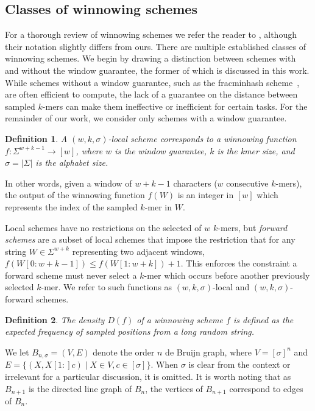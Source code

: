 \documentclass{article}
\newtheorem{definition}{Definition}[section]
\newcommand{\kmer}{{$k$-mer}}
\newcommand{\kmers}{{$k$-mers}}
\begin{document}
\subsection{Classes of winnowing schemes}
For a thorough review of winnowing schemes we refer the reader to \cite{shaw2022theory}, although their notation slightly differs from ours. There are multiple established classes of winnowing schemes. We begin by drawing a distinction between schemes with and without the window guarantee, the former of which is discussed in this work. While schemes without a window guarantee, such as the fracminhash scheme~\cite{irber2022lightweight}, are often efficient to compute, the lack of a guarantee on the distance between sampled \kmers{} can make them ineffective or inefficient for certain tasks. For the remainder of our work, we consider only schemes with a window guarantee. 

\begin{definition}
A $(w, k, \sigma)$-local scheme corresponds to a winnowing function $f: \Sigma^{w+k-1}\rightarrow [w]$, where $w$ is the window guarantee, $k$ is the kmer size, and $\sigma=|\Sigma|$ is the alphabet size.
\end{definition}
In other words, given a window of  $w+k-1$ characters ($w$ consecutive \kmers), the output of the winnowing function $f(W)$ is an integer in $[w]$ which represents the index of the sampled \kmer{} in $W$. 

Local schemes have no restrictions on the selected of $w$ \kmers{}, but \emph{forward schemes} are a subset of local schemes that impose the restriction that for any string $W\in \Sigma^{w+k}$ representing two adjacent windows, $f(W[0:w+k-1])\leq f(W[1:w+k]) + 1$. This enforces the constraint a forward scheme must never select a \kmer{} which occurs before another previously selected \kmer{}. We refer to such functions as $(w,k,\sigma)$-local and $(w,k,\sigma)$-forward schemes. 

\begin{definition}
The density $D(f)$ of a winnowing scheme $f$ is defined as the expected frequency of sampled positions from a long random string.
\end{definition}

We let $B_{n, \sigma}=(V, E)$ denote the order $n$ de Bruijn graph, where $V=[\sigma]^n$ and $E=\{(X, X[1:]c) \mid X\in V, c\in [\sigma]\}$. When $\sigma$ is clear from the context or irrelevant for a particular discussion, it is omitted. It is worth noting that as $B_{n+1}$ is the directed line graph of $B_n$, the vertices of $B_{n+1}$ correspond to edges of $B_n$.  
\end{document}
